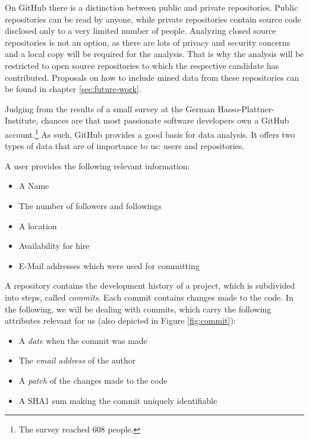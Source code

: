 On GitHub there is a distinction between public and private repositories. Public repositories can be read by anyone, while private repositories contain source code disclosed only to a very limited number of people. Analyzing closed source repositories is not an option, as there are lots of privacy and security concerns and a local copy will be required for the analysis. That is why the analysis will be restricted to open source repositories to which the respective candidate has contributed. Proposals on how to include mined data from these repositories can be found in chapter \ref{sec:future-work}.
\newline


Judging from the results of a small survey at the German Hasso-Plattner-Institute, chances are that most passionate software developers own a GitHub account.\footnote{The survey reached 608 people.}
As such, GitHub provides a  good basis for data analysis. It offers two types of data that are of importance to us: users and repositories.
\newline

A user provides the following relevant information:
\begin{itemize}
  \item A Name
  \item The number of followers and followings
  \item A location
  \item Availability for hire
  \item E-Mail addresses which were used for committing
\end{itemize}
\vspace{1em}

\noindent A repository contains the development history of a project, which is subdivided into steps, called \textit{commits}. Each commit contains changes made to the code. In the following, we will be dealing with commits, which carry the following attributes relevant for us (also depicted in Figure \ref{fig:commit}):

\begin{itemize}
    \item A \textit{date} when the commit was made
    \item The \textit{email address} of the author
    \item A \textit{patch} of the changes made to the code
    \item A SHA1 sum making the commit uniquely identifiable
\end{itemize}


